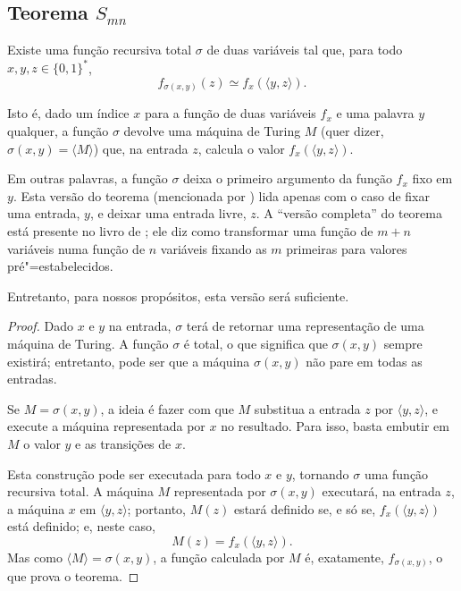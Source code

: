 \subsection{Teorema $S_{mn}$}
\label{sec:s_m_n_theorem}

\begin{theorem}
    Existe uma função recursiva total $\sigma$ de duas variáveis tal que,
    para todo $x, y, z \in \{0, 1\}^*$,
    \begin{equation*}
        f_{\sigma(x, y)}(z) \simeq f_x(\langle y, z \rangle).
    \end{equation*}
\end{theorem}

Isto é,
dado um índice $x$ para a função de duas variáveis $f_x$
e uma palavra $y$ qualquer,
a função $\sigma$ devolve uma máquina de Turing $M$
(quer dizer, $\sigma(x, y) = \langle M \rangle$)
que, na entrada $z$,
calcula o valor $f_x(\langle y, z \rangle)$.

Em outras palavras,
a função $\sigma$ deixa o primeiro argumento da função $f_x$
fixo em $y$.
Esta versão do teorema
(mencionada por )
lida apenas com o caso de fixar uma entrada, $y$,
e deixar uma entrada livre, $z$.
A ``versão completa'' do teorema
está presente no livro de ;
ele diz como transformar uma função de $m + n$ variáveis
numa função de $n$ variáveis
fixando as $m$ primeiras para valores pré"=estabelecidos.

Entretanto, para nossos propósitos,
esta versão será suficiente.

\begin{proof}
    Dado $x$ e $y$ na entrada,
    $\sigma$ terá de retornar uma representação de uma máquina de Turing.
    A função $\sigma$ é total,
    o que significa que $\sigma(x, y)$ sempre existirá;
    entretanto,
    pode ser que a máquina $\sigma(x, y)$ não pare em todas as entradas.

    Se $M = \sigma(x, y)$,
    a ideia é fazer com que $M$ substitua a entrada $z$ por $\langle y, z \rangle$,
    e execute a máquina representada por $x$ no resultado.
    Para isso,
    basta embutir em $M$ o valor $y$ e as transições de $x$.

    Esta construção pode ser executada para todo $x$ e $y$,
    tornando $\sigma$ uma função recursiva total.
    A máquina $M$ representada por $\sigma(x, y)$ executará,
    na entrada $z$, a máquina $x$ em $\langle y, z \rangle$;
    portanto,
    $M(z)$ estará definido se, e só se, $f_x(\langle y, z \rangle)$ está definido;
    e, neste caso,
    \begin{equation*}
        M(z) = f_x( \langle y, z \rangle ).
    \end{equation*}
    Mas como $\langle M \rangle = \sigma(x, y)$,
    a função calculada por $M$ é, exatamente, $f_{\sigma(x, y)}$,
    o que prova o teorema.
\end{proof}
